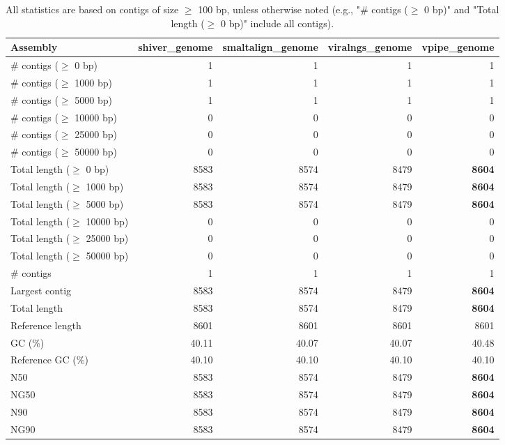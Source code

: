 \documentclass[12pt,a4paper]{article}
\begin{document}
\begin{table}[ht]
\begin{center}
\caption{All statistics are based on contigs of size $\geq$ 100 bp, unless otherwise noted (e.g., "\# contigs ($\geq$ 0 bp)" and "Total length ($\geq$ 0 bp)" include all contigs).}
\begin{tabular}{|l*{4}{|r}|}
\hline
Assembly & shiver\_genome & smaltalign\_genome & viralngs\_genome & vpipe\_genome \\ \hline
\# contigs ($\geq$ 0 bp) & 1 & 1 & 1 & 1 \\ \hline
\# contigs ($\geq$ 1000 bp) & 1 & 1 & 1 & 1 \\ \hline
\# contigs ($\geq$ 5000 bp) & 1 & 1 & 1 & 1 \\ \hline
\# contigs ($\geq$ 10000 bp) & 0 & 0 & 0 & 0 \\ \hline
\# contigs ($\geq$ 25000 bp) & 0 & 0 & 0 & 0 \\ \hline
\# contigs ($\geq$ 50000 bp) & 0 & 0 & 0 & 0 \\ \hline
Total length ($\geq$ 0 bp) & 8583 & 8574 & 8479 & {\bf 8604} \\ \hline
Total length ($\geq$ 1000 bp) & 8583 & 8574 & 8479 & {\bf 8604} \\ \hline
Total length ($\geq$ 5000 bp) & 8583 & 8574 & 8479 & {\bf 8604} \\ \hline
Total length ($\geq$ 10000 bp) & 0 & 0 & 0 & 0 \\ \hline
Total length ($\geq$ 25000 bp) & 0 & 0 & 0 & 0 \\ \hline
Total length ($\geq$ 50000 bp) & 0 & 0 & 0 & 0 \\ \hline
\# contigs & 1 & 1 & 1 & 1 \\ \hline
Largest contig & 8583 & 8574 & 8479 & {\bf 8604} \\ \hline
Total length & 8583 & 8574 & 8479 & {\bf 8604} \\ \hline
Reference length & 8601 & 8601 & 8601 & 8601 \\ \hline
GC (\%) & 40.11 & 40.07 & 40.07 & 40.48 \\ \hline
Reference GC (\%) & 40.10 & 40.10 & 40.10 & 40.10 \\ \hline
N50 & 8583 & 8574 & 8479 & {\bf 8604} \\ \hline
NG50 & 8583 & 8574 & 8479 & {\bf 8604} \\ \hline
N90 & 8583 & 8574 & 8479 & {\bf 8604} \\ \hline
NG90 & 8583 & 8574 & 8479 & {\bf 8604} \\ \hline

\end{tabular}
\end{center}
\end{table}
\end{document}
